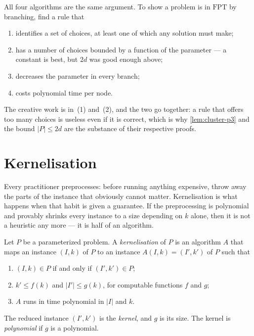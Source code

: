 All four algorithms are the same argument. To show a problem is in
$\mathrm{FPT}$ by branching, find a rule that
\begin{enumerate}[leftmargin=*,nosep]
  \item identifies a set of choices, at least one of which any solution must
        make;
  \item has a number of choices bounded by a function of the parameter --- a
        constant is best, but $2d$ was good enough above;
  \item decreases the parameter in every branch;
  \item costs polynomial time per node.
\end{enumerate}
The creative work is in~(1) and~(2), and the two go together: a rule that offers
too many choices is useless even if it is correct, which is why
\cref{lem:cluster-p3} and the bound $|P| \le 2d$ are the substance of their
respective proofs.

\section{Kernelisation}
\label{sec:fpt-kernelisation}

Every practitioner preprocesses: before running anything expensive, throw away
the parts of the instance that obviously cannot matter. Kernelisation is what
happens when that habit is given a guarantee. If the preprocessing is
polynomial and provably shrinks every instance to a size depending on $k$ alone,
then it is not a heuristic any more --- it is half of an algorithm.

\begin{definition}[Kernel]\label{def:kernel}
Let $P$ be a parameterized problem. A \emph{kernelisation} of $P$ is an
algorithm $A$ that maps an instance $(I,k)$ of $P$ to an instance
$A(I,k) = (I',k')$ of $P$ such that
\begin{enumerate}[label=(\roman*),leftmargin=*,nosep]
  \item $(I,k) \in P$ if and only if $(I',k') \in P$;
  \item $k' \le f(k)$ and $|I'| \le g(k)$, for computable functions $f$ and $g$;
  \item $A$ runs in time polynomial in $|I|$ and $k$.
\end{enumerate}
The reduced instance $(I',k')$ is the \emph{kernel}, and $g$ is its size. The
kernel is \emph{polynomial} if $g$ is a polynomial.
\end{definition}

